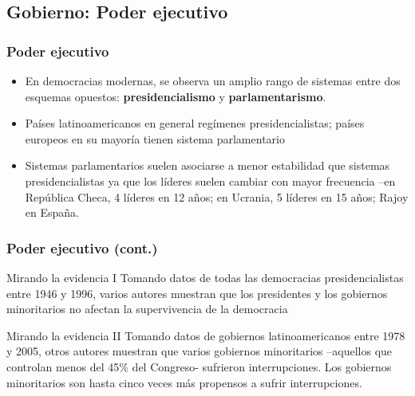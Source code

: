 \documentclass[14pt,aspectratio=169]{beamer}
\begin{document}
  \subsection{Gobierno: Poder ejecutivo}
  
  \begin{frame}\frametitle{Poder ejecutivo}
    \begin{itemize}
\item En democracias modernas, se observa un amplio rango de
  sistemas entre dos esquemas opuestos: \textbf{presidencialismo} y
  \textbf{parlamentarismo}.
  \item Países latinoamericanos en general  regímenes
    presidencialistas; países europeos en su
    mayoría tienen sistema parlamentario
    \item Sistemas parlamentarios suelen asociarse a menor estabilidad
      que sistemas presidencialistas ya que los líderes suelen cambiar
      con mayor frecuencia --en República Checa, 4 líderes en 12 años;
      en Ucrania, 5 líderes en 15 años; Rajoy en España.  
    \end{itemize}
    \end{frame}



    

 \begin{frame}\frametitle{Poder ejecutivo (cont.)}
   \begin{block}{Mirando la evidencia I}
Tomando datos de todas las democracias presidencialistas entre 1946 y
1996, varios autores muestran que los presidentes y los gobiernos
minoritarios no afectan la supervivencia de la democracia
     \end{block}
     \begin{block}{Mirando la evidencia II}
Tomando datos de gobiernos latinoamericanos entre 1978 y
2005, otros autores muestran que varios gobiernos minoritarios
--aquellos que controlan menos del 45\% del Congreso-
sufrieron interrupciones. Los gobiernos
minoritarios son hasta cinco veces más propensos a sufrir
interrupciones.
       \end{block}
     \end{frame}
    
\end{document}
